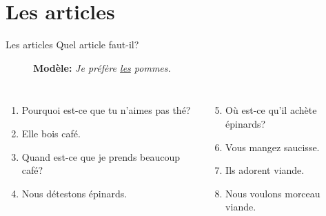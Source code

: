 \documentclass{beamer}
\begin{document}
  \section{Les articles}
    \begin{frame}{Les articles}
      Quel article faut-il?
      \begin{description}
        \item[] \textbf{Modèle:} \emph{Je préfère \underline{les} pommes.}
      \end{description}
      \begin{columns}
          \begin{enumerate}
            \item Pourquoi est-ce que tu n'aimes pas \underline{} thé?
            \item Elle bois \underline{} café.
            \item Quand est-ce que je prends beaucoup \underline{} café?
            \item Nous détestons \underline{} épinards.
          \end{enumerate}
          \begin{enumerate}
            \setcounter{enumi}{4}
            \item Où est-ce qu'il achète \underline{} épinards?
            \item Vous mangez \underline{} saucisse.
            \item Ils adorent \underline{} viande.
            \item Nous voulons \underline{} morceau \underline{} viande.
          \end{enumerate}
      \end{columns}
    \end{frame}
\end{document}
